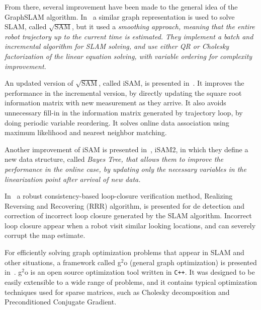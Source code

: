 From there, several improvement have been made to the general idea of the GraphSLAM algorithm. In~\cite{sqrtsam} a similar graph representation is used to solve SLAM, called $\sqrt{\text{SAM}}$, but it used a \it{smoothing} approach, meaning that the entire robot trajectory up to the current time is estimated. They implement a batch and incremental algorithm for SLAM solving, and use either QR or Cholesky factorization of the linear equation solving, with variable ordering for complexity improvement. 

An updated version of $\sqrt{\text{SAM}}$, called iSAM, is presented in~\cite{isam}. It improves the performance in the incremental version, by directly updating the square root information matrix with new measurement as they arrive. It also avoids unnecessary fill-in in the information matrix generated by trajectory loop, by doing periodic variable reordering. It solves online data association using maximum likelihood and nearest neighbor matching.

Another improvement of iSAM is presented in~\cite{isam2}, iSAM2, in which they define a new data structure, called \it{Bayes Tree}, that allows them to improve the performance in the online case, by updating only the necessary variables in the linearization point after arrival of new data. 

In~\cite{robustloop} a robust consistency-based loop-closure verification method, Realizing Reversing and Recovering (RRR) algorithm, is presented for de detection and correction of incorrect loop closure generated by the SLAM algorithm. Incorrect loop closure appear when a robot visit similar looking locations, and can severely corrupt the map estimate.     

For efficiently solving graph optimization problems that appear in SLAM and other situations, a framework called g$^2$o (general graph optimization) is presented in~\cite{g2o}. g$^2$o is an open source optimization tool written in \verb!C++!.  It was designed to be easily extensible to a wide range of problems, and it contains typical optimization techniques used for sparse matrices, such as Cholesky decomposition and Preconditioned Conjugate Gradient. 

